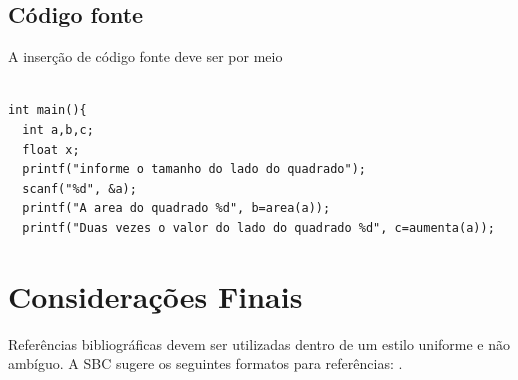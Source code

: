 \documentclass[12pt]{article}
\begin{document}
\subsection{Código fonte}
A inserção de código fonte deve ser por meio

\begin{lstlisting}

int main(){
  int a,b,c;
  float x;
  printf("informe o tamanho do lado do quadrado");
  scanf("%d", &a);
  printf("A area do quadrado %d", b=area(a));
  printf("Duas vezes o valor do lado do quadrado %d", c=aumenta(a));

\end{lstlisting}



\section{Considerações Finais}

Referências bibliográficas devem ser utilizadas dentro de um estilo uniforme e não ambíguo. A SBC sugere os seguintes formatos para referências: \cite{patterson} \cite{instructionset}.



\end{document}
